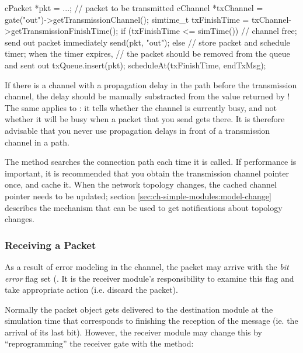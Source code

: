 \begin{cpp}
cPacket *pkt = ...; // packet to be transmitted
cChannel *txChannel = gate("out")->getTransmissionChannel();
simtime_t txFinishTime = txChannel->getTransmissionFinishTime();
if (txFinishTime <= simTime())
{
    // channel free; send out packet immediately
    send(pkt, "out");
}
else
{
    // store packet and schedule timer; when the timer expires,
    // the packet should be removed from the queue and sent out
    txQueue.insert(pkt);
    scheduleAt(txFinishTime, endTxMsg);
}
\end{cpp}

\begin{note}
  If there is a channel with a propagation delay in
  the path before the transmission channel, the delay should be manually
  substracted from the value returned by !
  The same applies to : it tells whether the channel is
  currently busy, and not whether it will be busy when a packet that you send
  gets there. It is therefore advisable that you never use propagation delays
  in front of a transmission channel in a path.
\end{note}

The  method searches the connection path each
time it is called. If performance is important, it is recommended that you
obtain the transmission channel pointer once, and cache it. When the network topology
changes, the cached channel pointer needs to be updated; section
\ref{sec:ch-simple-modules:model-change} describes the mechanism that can
be used to get notifications about topology changes.

\subsubsection{Receiving a Packet}

As a result of error modeling in the channel, the packet may arrive
with the \textit{bit error} flag set (.
It is the receiver module's responsibility to examine this flag
and take appropriate action (i.e. discard the packet).

Normally the packet object gets delivered to the destination module
at the simulation time that corresponds to finishing the reception
of the message (ie. the arrival of its last bit). However, the receiver
module may change this by ``reprogramming'' the receiver gate with
the  method:

